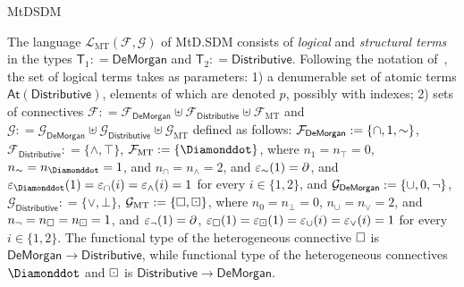\begin{entry}{MtDSDM}
\begin{clarifications}
  The language $\mathcal{L}_\mathrm{MT}(\mathcal{F}, \mathcal{G})$ of  MtD.SDM
  consists of  {\em logical}   and {\em structural terms} in the types
  $\mathsf{T}_1:  = \mathsf{De Morgan}$ and 
  $\mathsf{T}_2: = \mathsf{Distributive}$. 
  Following the notation of~, the set  of logical terms takes as
  parameters:
  1) a denumerable  set of atomic terms $\mathsf{At}(\mathsf{Distributive})$,
  elements of which are denoted $p$, possibly with indexes; 
  2)  sets of connectives 
  $\mathcal{F}: = \mathcal{F}_{\mathsf{De Morgan}} \uplus
                  \mathcal{F}_{\mathsf{Distributive}} \uplus
                  \mathcal{F}_{\mathrm{MT}}$
  and 
  $\mathcal{G}: = \mathcal{G}_{\mathsf{De Morgan}} \uplus
                  \mathcal{G}_{\mathsf{Distributive}} \uplus
                  \mathcal{G}_{\mathrm{MT}}$
  defined as follows: 
  $\mathcal{F}_{\mathsf{De Morgan}}: = \{\cap, 1, {\sim}\}$,
  $\mathcal{F}_{\mathsf{Distributive}}: = \{\wedge, \top \}$,
  $\mathcal{F}_{\mathrm{MT}}: = \{\wdia\}$, 
  where  
  $n_1 = n_\top = 0$, 
  $n_{\dneg} = n_{\wdia} = 1$, and 
  $n_\cap = n_\wedge = 2$, and
  $\varepsilon_{{\sim}}(1)=\partial$, and 
  $\varepsilon_{\wdia}(1) = \varepsilon_{\cap}(i) = \varepsilon_{\wedge}(i) = 1$ 
  for every 
  $i\in \{1, 2\}$, and 
  $\mathcal{G}_{\mathsf{De Morgan}}: = \{\cup, 0, \neg\}$,
  $\mathcal{G}_{\mathsf{Distributive}}: = \{\vee, \bot \}$,
  $\mathcal{G}_{\mathrm{MT}}: = \{\Box, \boxdot\}$, 
  where 
  $n_0 = n_\bot = 0$,
  $n_\cup = n_\vee = 2$, and 
  $n_{\neg} = n_{\Box} = n_{\boxdot} = 1$, and
  $\varepsilon_{\neg}(1)=\partial$, $\varepsilon_{\Box}(1) =\varepsilon_{\boxdot}(1) = \varepsilon_{\cup}(i) = \varepsilon_{\vee}(i) = 1$ 
  for every $i\in \{1, 2\}$. 
  The functional type of the heterogeneous connective $\Box$ is $\mathsf{De
  Morgan}\rightarrow \mathsf{Distributive}$, while functional type of the
  heterogeneous connectives $\wdia$ and $\boxdot$ is
  $\mathsf{Distributive}\rightarrow \mathsf{De Morgan}$.
  

\end{clarifications}
\end{entry}

